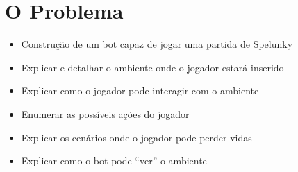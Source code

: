 \chapter{\label{chap:problem}O Problema}

\begin{itemize}
    \item Construção de um bot capaz de jogar uma partida de Spelunky
    \item Explicar e detalhar o ambiente onde o jogador estará inserido
    \item Explicar como o jogador pode interagir com o ambiente
    \item Enumerar as possíveis ações do jogador
    \item Explicar os cenários onde o jogador pode perder vidas
    \item Explicar como o bot pode ``ver'' o ambiente
\end{itemize}

